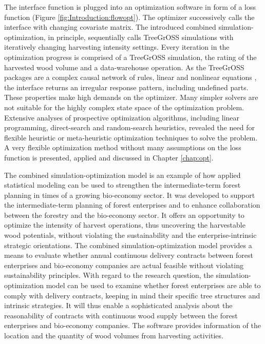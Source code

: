 The interface function is plugged into an optimization software in form of a loss function (Figure \ref{fig:Introduction:flowopt}). The optimizer successively calls the interface with changing covariate matrix. The introduced combined si\-mu\-la\-tion-op\-ti\-mi\-za\-tion, in principle, sequentially calls TreeGrOSS simulations with iteratively changing harvesting intensity settings. Every iteration in the optimization progress is comprised of a TreeGrOSS simulation, the rating of the harvested wood volume and a data-warehouse operation. As the TreeGrOSS packages are a complex causal network of rules, linear and nonlinear equations \citep[p. 180]{hansen_2014}, the interface returns an irregular response pattern, including undefined parts. These properties make high demands on the optimizer. Many simpler solvers are not suitable for the highly complex state space of the optimization problem. Extensive analyses of prospective optimization algorithms, including linear programming, direct-search and random-search heuristics, revealed the need for flexible heuristic or meta-heuristic optimization techniques to solve the problem. A very flexible optimization method without many assumptions on the loss function is presented, applied and discussed in Chapter \ref{chap:opt}.

The combined simulation-optimization model is an example of how applied statistical modeling can be used to strengthen the intermediate-term forest planning in times of a growing bio-economy sector. It was developed to support the intermediate-term planning of forest enterprises and to enhance collaboration between the forestry and the bio-economy sector. It offers an opportunity to optimize the intensity of harvest operations, thus uncovering the harvestable wood potentials, without violating the sustainability and the enterprise-intrinsic strategic orientations. The combined si\-mu\-la\-tion-op\-ti\-mi\-za\-tion model provides a means to evaluate whether annual continuous delivery contracts between forest enterprises and bio-economy companies are actual feasible without violating sustainability principles. With regard to the research question, the si\-mu\-la\-tion-op\-ti\-mi\-za\-tion model can be used to examine whether forest enterprises are able to comply with delivery contracts, keeping in mind their specific tree structures and intrinsic strategies. It will thus enable a sophisticated analysis about the reasonability of contracts with continuous wood supply between the forest enterprises and bio-economy companies. The software provides information of the location and the quantity of wood volumes from harvesting activities.

